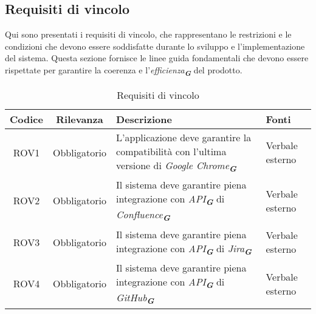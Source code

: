\subsection{Requisiti di vincolo}
\label{sec:req_vincolo}
Qui sono presentati i requisiti di vincolo, che rappresentano le restrizioni e le condizioni
che devono essere soddisfatte durante lo sviluppo e l'implementazione del sistema. Questa
sezione fornisce le linee guida fondamentali che devono essere rispettate per garantire la
coerenza e l'\emph{efficienza}\textsubscript{\textit{\textbf{G}}} del prodotto.
\begin{table}[h!]
    \centering
    \renewcommand{\arraystretch}{1.6} %
    \begin{tabularx}{\textwidth}{|>{\centering\arraybackslash}c|>{\centering\arraybackslash}c|>{\centering\arraybackslash}X|>{\centering\arraybackslash}p{3cm}|} \hline
    \rowcolor[HTML]{FFD700} 
    \textbf{Codice} & \textbf{Rilevanza} & \textbf{Descrizione} & \textbf{Fonti} \\ \hline
    ROV1 & Obbligatorio & L'applicazione deve garantire la compatibilità con l'ultima versione di \emph{Google Chrome}\textsubscript{\textit{\textbf{G}}} & Verbale esterno \\ \hline
    ROV2 & Obbligatorio & Il sistema deve garantire piena integrazione con \emph{API}\textsubscript{\textit{\textbf{G}}} di \emph{Confluence}\textsubscript{\textit{\textbf{G}}} & Verbale esterno \\ \hline
    ROV3 & Obbligatorio & Il sistema deve garantire piena integrazione con \emph{API}\textsubscript{\textit{\textbf{G}}} di \emph{Jira}\textsubscript{\textit{\textbf{G}}} & Verbale esterno\\ \hline
    ROV4 & Obbligatorio & Il sistema deve garantire piena integrazione con \emph{API}\textsubscript{\textit{\textbf{G}}} di \emph{GitHub}\textsubscript{\textit{\textbf{G}}} & Verbale esterno \\ \hline
    \end{tabularx}
    \caption{Requisiti di vincolo}
    \label{tab:Requisiti_di_vincolo}
\end{table}

\newpage
